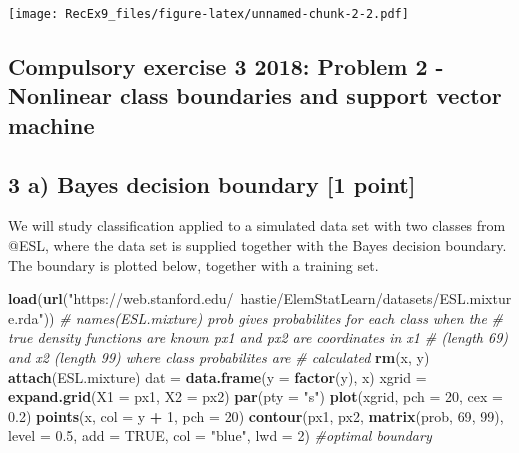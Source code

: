 \documentclass[]{article}
\newenvironment{Shaded}{\begin{snugshade}}{\end{snugshade}}
\newcommand{\KeywordTok}[1]{\textcolor[rgb]{0.13,0.29,0.53}{\textbf{#1}}}
\newcommand{\DataTypeTok}[1]{\textcolor[rgb]{0.13,0.29,0.53}{#1}}
\newcommand{\DecValTok}[1]{\textcolor[rgb]{0.00,0.00,0.81}{#1}}
\newcommand{\FloatTok}[1]{\textcolor[rgb]{0.00,0.00,0.81}{#1}}
\newcommand{\StringTok}[1]{\textcolor[rgb]{0.31,0.60,0.02}{#1}}
\newcommand{\CommentTok}[1]{\textcolor[rgb]{0.56,0.35,0.01}{\textit{#1}}}
\newcommand{\OtherTok}[1]{\textcolor[rgb]{0.56,0.35,0.01}{#1}}
\newcommand{\OperatorTok}[1]{\textcolor[rgb]{0.81,0.36,0.00}{\textbf{#1}}}
\newcommand{\NormalTok}[1]{#1}
\begin{document}
\texttt{[image: RecEx9\_files/figure-latex/unnamed-chunk-2-2.pdf]}

\subsection{Compulsory exercise 3 2018: Problem 2 - Nonlinear class
boundaries and support vector
machine}\label{compulsory-exercise-3-2018-problem-2---nonlinear-class-boundaries-and-support-vector-machine}

\subsection{3 a) Bayes decision boundary {[}1
point{]}}\label{a-bayes-decision-boundary-1-point}

We will study classification applied to a simulated data set with two
classes from @ESL, where the data set is supplied together with the
Bayes decision boundary. The boundary is plotted below, together with a
training set.

\begin{Shaded}
\begin{Highlighting}[]
\KeywordTok{load}\NormalTok{(}\KeywordTok{url}\NormalTok{(}\StringTok{"https://web.stanford.edu/~hastie/ElemStatLearn/datasets/ESL.mixture.rda"}\NormalTok{))}
\CommentTok{# names(ESL.mixture) prob gives probabilites for each class when the}
\CommentTok{# true density functions are known px1 and px2 are coordinates in x1}
\CommentTok{# (length 69) and x2 (length 99) where class probabilites are}
\CommentTok{# calculated}
\KeywordTok{rm}\NormalTok{(x, y)}
\KeywordTok{attach}\NormalTok{(ESL.mixture)}
\NormalTok{dat =}\StringTok{ }\KeywordTok{data.frame}\NormalTok{(}\DataTypeTok{y =} \KeywordTok{factor}\NormalTok{(y), x)}
\NormalTok{xgrid =}\StringTok{ }\KeywordTok{expand.grid}\NormalTok{(}\DataTypeTok{X1 =}\NormalTok{ px1, }\DataTypeTok{X2 =}\NormalTok{ px2)}
\KeywordTok{par}\NormalTok{(}\DataTypeTok{pty =} \StringTok{"s"}\NormalTok{)}
\KeywordTok{plot}\NormalTok{(xgrid, }\DataTypeTok{pch =} \DecValTok{20}\NormalTok{, }\DataTypeTok{cex =} \FloatTok{0.2}\NormalTok{)}
\KeywordTok{points}\NormalTok{(x, }\DataTypeTok{col =}\NormalTok{ y }\OperatorTok{+}\StringTok{ }\DecValTok{1}\NormalTok{, }\DataTypeTok{pch =} \DecValTok{20}\NormalTok{)}
\KeywordTok{contour}\NormalTok{(px1, px2, }\KeywordTok{matrix}\NormalTok{(prob, }\DecValTok{69}\NormalTok{, }\DecValTok{99}\NormalTok{), }\DataTypeTok{level =} \FloatTok{0.5}\NormalTok{, }\DataTypeTok{add =} \OtherTok{TRUE}\NormalTok{, }\DataTypeTok{col =} \StringTok{"blue"}\NormalTok{, }
    \DataTypeTok{lwd =} \DecValTok{2}\NormalTok{)  }\CommentTok{#optimal boundary}
\end{Highlighting}
\end{Shaded}
\end{document}
